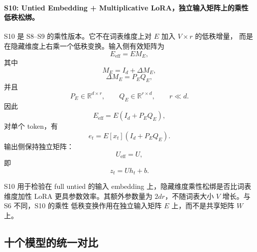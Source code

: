 \paragraph{S10: Untied Embedding + Multiplicative LoRA，独立输入矩阵上的乘性低秩松绑。}
S10 是 S8--S9 的乘性版本。它不在词表维度上对 $E$ 加入 $V \times r$ 的低秩增量，
而是在隐藏维度上右乘一个低秩变换。输入侧有效矩阵为
\begin{equation}
    E_{\mathrm{eff}} = E M_E,
\end{equation}
其中
\begin{equation}
    M_E = I_d + \Delta M_E,
\end{equation}
\begin{equation}
    \Delta M_E = P_E Q_E,
\end{equation}
并且
\begin{equation}
    P_E \in \mathbb{R}^{d \times r}, \qquad
    Q_E \in \mathbb{R}^{r \times d}, \qquad
    r \ll d.
\end{equation}
因此
\begin{equation}
    E_{\mathrm{eff}} = E(I_d+P_EQ_E),
\end{equation}
对单个 token，有
\begin{equation}
    e_t = E[x_t](I_d+P_EQ_E).
\end{equation}
输出侧保持独立矩阵：
\begin{equation}
    U_{\mathrm{eff}} = U,
\end{equation}
即
\begin{equation}
    z_t = U h_t + b.
\end{equation}

S10 用于检验在 full untied 的输入 embedding 上，隐藏维度乘性松绑是否比词表维度加性 LoRA
更具参数效率。其额外参数量为 $2dr$，不随词表大小 $V$ 增长。与 S6 不同，S10 的乘性
低秩变换作用在独立输入矩阵 $E$ 上，而不是共享矩阵 $W$ 上。

\subsection{十个模型的统一对比}

